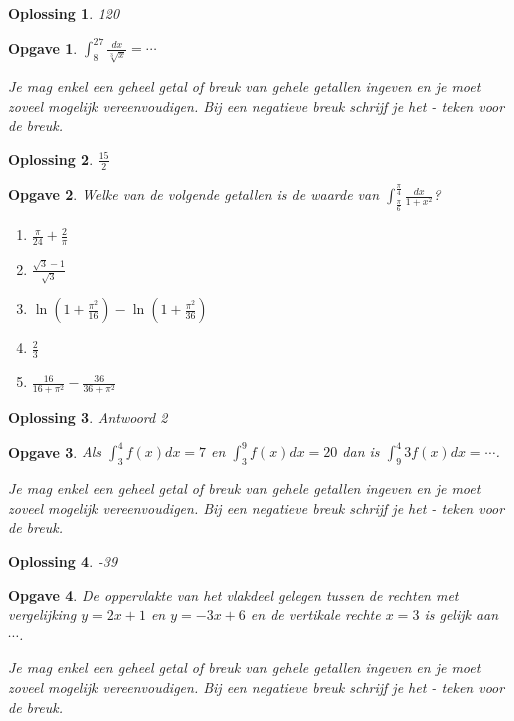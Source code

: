 \documentclass{article}
\newtheorem{opgave}{Opgave}
\newtheorem*{oplossing}{Oplossing}
\begin{document}
\begin{oplossing}
120
\end{oplossing}

\begin{opgave}
$\int ^{27}_{8} \frac{dx}{\sqrt[3]{x}} = \cdots $\vspace{1mm}

\noindent Je mag enkel een geheel getal of breuk van gehele getallen ingeven en je moet zoveel mogelijk vereenvoudigen. Bij een negatieve breuk schrijf je het - teken voor de breuk.
\end{opgave}

\begin{oplossing}
$\frac{15}{2}$
\end{oplossing}

\begin{opgave}
Welke van de volgende getallen is de waarde van $\int^{\frac{\pi}{4}}_{\frac{\pi}{6}} \frac{dx}{1+x^2}$?

\begin{enumerate}
\item $\frac{\pi}{24}+\frac{2}{\pi}$
\item $\frac{\sqrt{3}-1}{\sqrt {3}}$
\item $\ln \left( 1+\frac{\pi ^2}{16} \right)- \ln \left( 1+ \frac{\pi ^2}{36} \right)$
\item $\frac{2}{3}$
\item $\frac{16}{16+\pi ^2}-\frac{36}{36+\pi ^2}$
\end{enumerate}
\end{opgave}

\begin{oplossing}
Antwoord 2
\end{oplossing}

\begin{opgave}
Als $\int ^4_3 f(x)dx = 7$ en $\int ^9_3 f(x)dx = 20$ dan is $\int ^4_9 3f(x) dx = \cdots$.\vspace{1cm}

\noindent Je mag enkel een geheel getal of breuk van gehele getallen ingeven en je moet zoveel mogelijk vereenvoudigen. Bij een negatieve breuk schrijf je het - teken voor de breuk.
\end{opgave}

\begin{oplossing}
-39
\end{oplossing}

\begin{opgave}
De oppervlakte van het vlakdeel gelegen tussen de rechten met vergelijking $y=2x+1$ en $y=-3x+6$ en de vertikale rechte $x=3$ is gelijk aan $\cdots$.\vspace{1cm}

\noindent Je mag enkel een geheel getal of breuk van gehele getallen ingeven en je moet zoveel mogelijk vereenvoudigen. Bij een negatieve breuk schrijf je het - teken voor de breuk.
\end{opgave}
\end{document}

